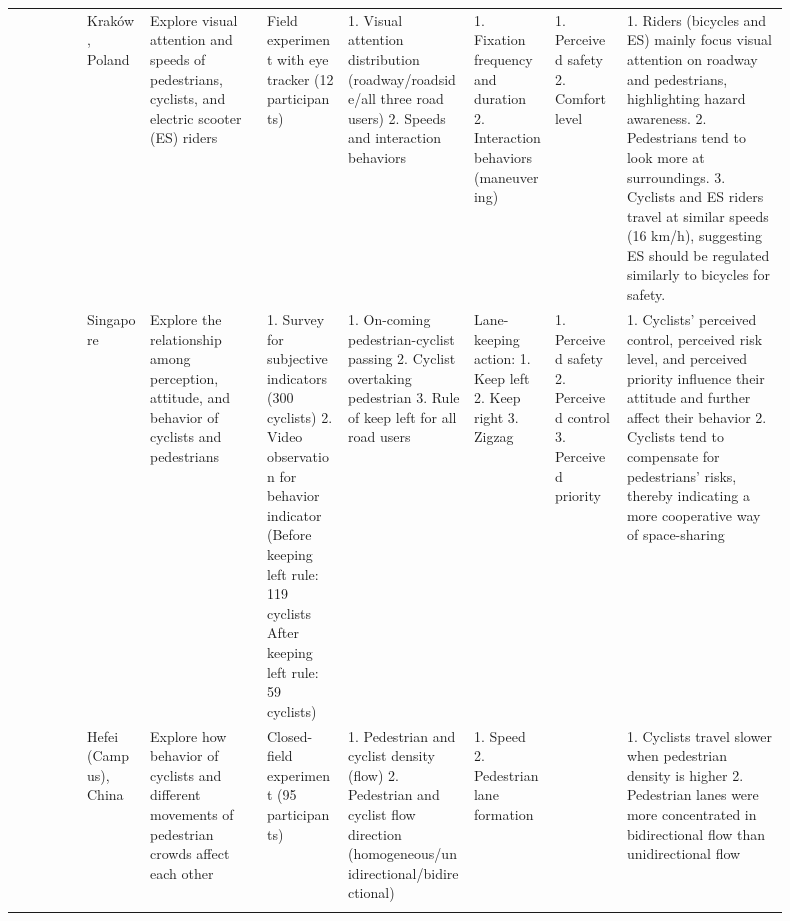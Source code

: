 {\begin{longtable}{@{}
    R{0.085\linewidth}
    R{0.075\linewidth}
    R{0.135\linewidth}
    R{0.095\linewidth}
    R{0.145\linewidth}
    R{0.095\linewidth}
    R{0.085\linewidth}
    R{0.185\linewidth}@{}}
  \citet{pashkevich2022visual}
    & Kraków, Poland
    & Explore visual attention and speeds of pedestrians, cyclists, and electric
      scooter (ES) riders
    & Field experiment with eye tracker (12 participants)
    & 1. Visual attention distribution (roadway/roadside/all three road users)
      2. Speeds and interaction behaviors
    & 1. Fixation frequency and duration
      2. Interaction behaviors (maneuvering)
    & 1. Perceived safety
      2. Comfort level
    & 1. Riders (bicycles and ES) mainly focus visual attention on roadway and
      pedestrians, highlighting hazard awareness.
      2. Pedestrians tend to look more at surroundings.
      3. Cyclists and ES riders travel at similar speeds (16 km/h), suggesting
      ES should be regulated similarly to bicycles for safety.\\
  \addlinespace[4pt]

  \citet{che2021interaction}
    & Singapore
    & Explore the relationship among perception, attitude, and behavior of
      cyclists and pedestrians
    & 1. Survey for subjective indicators (300 cyclists)
      2. Video observation for behavior indicator (Before keeping left rule:
      119 cyclists After keeping left rule: 59 cyclists)
    & 1. On-coming pedestrian-cyclist passing
      2. Cyclist overtaking pedestrian
      3. Rule of keep left for all road users
    & Lane-keeping action:
      1. Keep left
      2. Keep right
      3. Zigzag
    & 1. Perceived safety
      2. Perceived control
      3. Perceived priority
    & 1. Cyclists' perceived control, perceived risk level, and perceived
      priority influence their attitude and further affect their behavior
      2. Cyclists tend to compensate for pedestrians' risks, thereby indicating
      a more cooperative way of space-sharing\\
  \addlinespace[4pt]

  \citet{huang2021investigating}
    & Hefei (Campus), China
    & Explore how behavior of cyclists and different movements of pedestrian
      crowds affect each other
    & Closed-field experiment (95 participants)
    & 1. Pedestrian and cyclist density (flow)
      2. Pedestrian and cyclist flow direction
      (homogeneous/unidirec\-tional/bidirectional)
    & 1. Speed
      2. Pedestrian lane formation
    &
    & 1. Cyclists travel slower when pedestrian density is higher
      2. Pedestrian lanes were more concentrated in bidirectional flow than
      unidirectional flow\\
  \addlinespace[4pt]


\end{longtable}}
